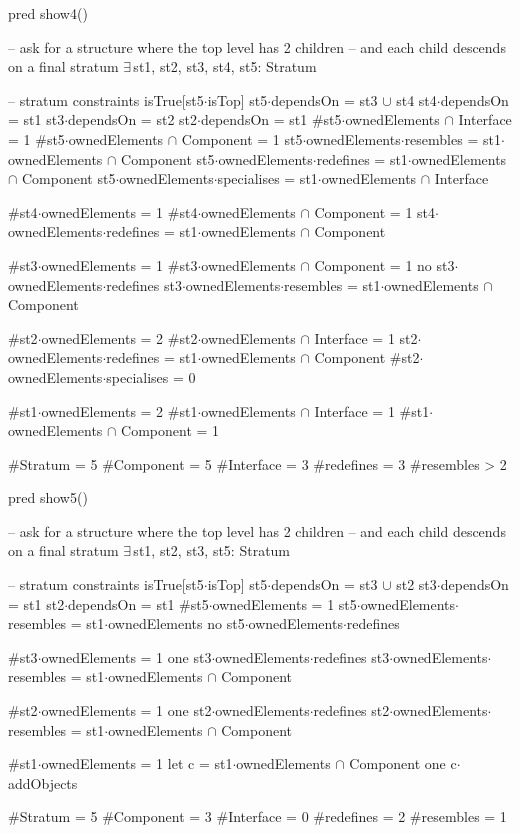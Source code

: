 pred show4()
{
  -- ask for a structure where the top level has 2 children
  -- and each child descends on a final stratum
  $\exists\,$st1, st2, st3, st4, st5: Stratum
  {
    -- stratum constraints
    isTrue[st5$\cdot$isTop]
    st5$\cdot$dependsOn = st3 $\cup$ st4
    st4$\cdot$dependsOn = st1
    st3$\cdot$dependsOn = st2
    st2$\cdot$dependsOn = st1
    #st5$\cdot$ownedElements $\cap$ Interface = 1
    #st5$\cdot$ownedElements $\cap$ Component = 1
    st5$\cdot$ownedElements$\cdot$resembles = st1$\cdot$ownedElements $\cap$ Component
    st5$\cdot$ownedElements$\cdot$redefines = st1$\cdot$ownedElements $\cap$ Component
    st5$\cdot$ownedElements$\cdot$specialises = st1$\cdot$ownedElements $\cap$ Interface
    
    #st4$\cdot$ownedElements = 1
    #st4$\cdot$ownedElements $\cap$ Component = 1
    st4$\cdot$ownedElements$\cdot$redefines = st1$\cdot$ownedElements $\cap$ Component

    #st3$\cdot$ownedElements = 1
    #st3$\cdot$ownedElements $\cap$ Component = 1
    no st3$\cdot$ownedElements$\cdot$redefines
    st3$\cdot$ownedElements$\cdot$resembles = st1$\cdot$ownedElements $\cap$ Component

    #st2$\cdot$ownedElements = 2
    #st2$\cdot$ownedElements $\cap$ Interface = 1
    st2$\cdot$ownedElements$\cdot$redefines = st1$\cdot$ownedElements $\cap$ Component  
    #st2$\cdot$ownedElements$\cdot$specialises = 0
    
    #st1$\cdot$ownedElements = 2
    #st1$\cdot$ownedElements $\cap$ Interface = 1
    #st1$\cdot$ownedElements $\cap$ Component = 1
  }
  
  #Stratum = 5
  #Component = 5
  #Interface = 3
  #redefines = 3
  #resembles > 2
}

pred show5()
{
  -- ask for a structure where the top level has 2 children
  -- and each child descends on a final stratum
  $\exists\,$st1, st2, st3, st5: Stratum
  {
    -- stratum constraints
    isTrue[st5$\cdot$isTop]
    st5$\cdot$dependsOn = st3 $\cup$ st2
    st3$\cdot$dependsOn = st1
    st2$\cdot$dependsOn = st1
    #st5$\cdot$ownedElements = 1
    st5$\cdot$ownedElements$\cdot$resembles = st1$\cdot$ownedElements
    no st5$\cdot$ownedElements$\cdot$redefines
    
    #st3$\cdot$ownedElements = 1
    one st3$\cdot$ownedElements$\cdot$redefines
    st3$\cdot$ownedElements$\cdot$resembles = st1$\cdot$ownedElements $\cap$ Component

    #st2$\cdot$ownedElements = 1
    one st2$\cdot$ownedElements$\cdot$redefines
    st2$\cdot$ownedElements$\cdot$resembles = st1$\cdot$ownedElements $\cap$ Component
    
    #st1$\cdot$ownedElements = 1
    let c = st1$\cdot$ownedElements $\cap$ Component
    {
      one c$\cdot$addObjects
    }
  }
  
  #Stratum = 5
  #Component = 3
  #Interface = 0
  #redefines = 2
  #resembles = 1
}

